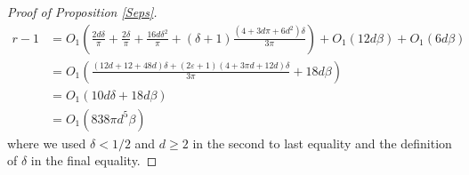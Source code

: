 \documentclass[11pt]{article}
\renewcommand{\epsilon}{\varepsilon}
\theoremstyle{remark}
\begin{document}
\begin{proof}[Proof of Proposition \ref{Seps}]
\begin{align*}
r-1 & = O_1\left(\frac{2d\delta}{\pi} + \frac{2\delta}{\pi} + \frac{16d\delta^2}{\pi} + (\delta + 1)\frac{(4 + 3d\pi + 6d^2)\delta}{3\pi}\right) + O_1(12d\beta) + O_1(6d\beta)  \\
& = O_1\left(\frac{(12d + 12 + 48d)\delta + (2\epsilon + 1)(4 + 3\pi d + 12d)\delta}{3\pi} + 18d\beta\right)\\
& = O_1(10d\delta + 18d\beta) \\
& = O_1(838\pi d^5\beta)
\end{align*} where we used $\delta < 1/2$ and $d \geqslant 2$ in the second to last equality and the definition of $\delta$ in the final equality.


\end{proof}
\end{document}
